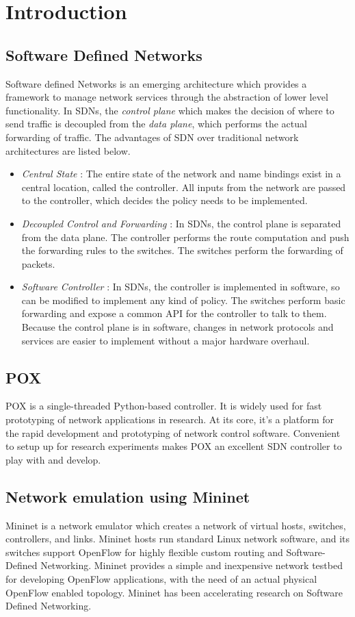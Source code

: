 \chapter{Introduction}

\section{Software Defined Networks}
Software defined Networks is an emerging architecture which provides a framework to manage network services through the abstraction of lower level functionality. In SDNs, the \emph{control plane} which makes the decision of where to send traffic is decoupled from the \emph{data plane}, which performs the actual forwarding of traffic. The advantages of SDN over traditional network architectures are listed below.
\begin{itemize}
	\item \textit{Central State} : The entire state of the network and name bindings exist in a central location, called the controller. All inputs from the network are passed to the controller, which decides the policy needs to be implemented. 
	\item \textit{Decoupled Control and Forwarding} : In SDNs, the control plane is separated from the data plane. The controller performs the route computation and push the forwarding rules to the switches. The switches perform the forwarding of packets. 
	\item \textit{Software Controller} : In SDNs, the controller is implemented in software, so can be modified to implement any kind of policy. The switches perform basic forwarding and expose a common API for the controller to talk to them. Because the control plane is in software, changes in network protocols and services are easier to implement without a major hardware overhaul. 
\end{itemize}

\section{POX}
POX \cite{pox} is a single-threaded Python-based controller. It is widely used for fast prototyping of network applications in research. At its core, it’s a platform for the rapid development and prototyping of network control software. Convenient to setup up for research experiments makes POX an excellent SDN controller to play with and develop.
  
\section{Network emulation using Mininet}
Mininet \cite{mininet} is a network emulator which creates a network of virtual hosts, switches, controllers, and links. Mininet hosts run standard Linux network software, and its switches support OpenFlow for highly flexible custom routing and Software-Defined Networking. Mininet provides a simple and inexpensive network testbed for developing OpenFlow applications, with the need of an actual physical OpenFlow enabled topology. Mininet has been accelerating research on Software Defined Networking.

